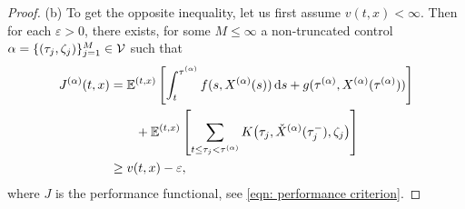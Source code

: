 \begin{proof}
    (b) To get the opposite inequality, let us first assume $v(t,x) < \infty$. Then for each $\varepsilon > 0$, there exists, for some $M \leq \infty$ a non-truncated control $\alpha= \{(\tau_j, \zeta_j)\}_{j=1}^M \in \mathcal{V}$ such that 
    \begin{align}
        J^{(\alpha)}(t,x) &= \mathbb{E}^{(t,x)} \left[\int_t^{\tau^{(\alpha)}} f(s, X^{(\alpha)}(s)) \,\mathrm{d} s + g(\tau^{(\alpha)}, X^{(\alpha)}(\tau^{(\alpha)}))\right] \nonumber \\
        & \qquad + \mathbb{E}^{(t,x)} \left[\sum_{t \leq \tau_j < \tau^{(\alpha)}} K\big(\tau_j, \check{X}^{(\alpha)}(\tau_j^-), \zeta_j \big)\right] \nonumber \nonumber\\
        & \geq v(t,x) - \varepsilon,
        \label{eqn: (10.1.5) in ØS}
    \end{align}
    where $J$ is the performance functional, see \eqref{eqn: performance criterion}. 


\end{proof}
